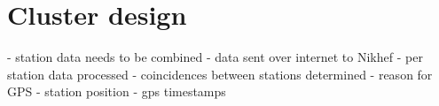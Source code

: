 \section{Cluster design}

- station data needs to be combined
- data sent over internet to Nikhef
    - per station data processed
    - coincidences between stations determined
- reason for GPS
    - station position
    - gps timestamps
